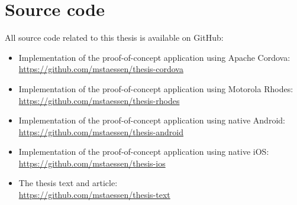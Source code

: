\chapter{Source code}
\label{app:source}

All source code related to this thesis is available on GitHub:

\begin{itemize}
    \item Implementation of the proof-of-concept application using Apache Cordova: \\ \url{https://github.com/mstaessen/thesis-cordova}
    \item Implementation of the proof-of-concept application using Motorola Rhodes: \\ \url{https://github.com/mstaessen/thesis-rhodes}
    \item Implementation of the proof-of-concept application using native Android: \\ \url{https://github.com/mstaessen/thesis-android}
    \item Implementation of the proof-of-concept application using native iOS: \\ \url{https://github.com/mstaessen/thesis-ios}
    \item The thesis text and article: \\ \url{https://github.com/mstaessen/thesis-text}
\end{itemize}

